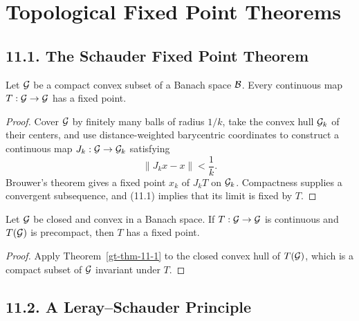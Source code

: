 \chapter{Topological Fixed Point Theorems}

\section*{11.1. The Schauder Fixed Point Theorem}

\begin{theorem}
\label{gt-thm-11-1}
Let $\mathcal{G}$ be a compact convex subset of a Banach space $\mathcal{B}$. Every continuous
map $T:\mathcal{G}\to\mathcal{G}$ has a fixed point.
\end{theorem}
\begin{proof}
\sketch Cover $\mathcal{G}$ by finitely many balls of radius $1/k$, take the convex
hull $\mathcal{G}_k$ of their centers, and use distance-weighted barycentric
coordinates to construct a continuous map $J_k:\mathcal{G}\to\mathcal{G}_k$ satisfying
\begin{equation}
\tag{11.1}
\|J_kx-x\|<\frac1k.
\end{equation}
Brouwer's theorem gives a fixed point $x_k$ of $J_kT$ on $\mathcal{G}_k$.
Compactness supplies a convergent subsequence, and (11.1) implies that its
limit is fixed by $T$.
\end{proof}

\begin{corollary}
\label{gt-cor-11-2}

Let $\mathcal{G}$ be closed and convex in a Banach space. If $T:\mathcal{G}\to\mathcal{G}$ is
continuous and $T(\mathcal{G})$ is precompact, then $T$ has a fixed point.
\end{corollary}
\begin{proof}
\sketch Apply Theorem~\ref{gt-thm-11-1} to the closed convex hull of
$T(\mathcal{G})$, which is a compact subset of $\mathcal{G}$ invariant under $T$.
\end{proof}

\section*{11.2. A Leray--Schauder Principle}

